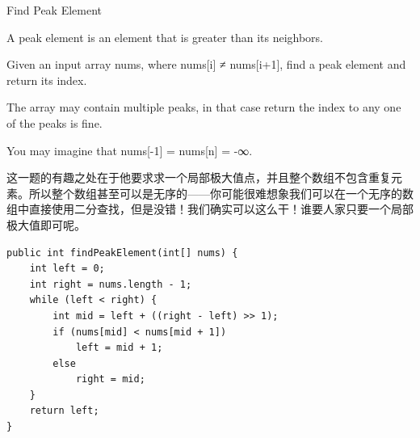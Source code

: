 \documentclass[9pt, b5paaper]{book}
\begin{document}
Find Peak Element

A peak element is an element that is greater than its neighbors.

Given an input array nums, where nums[i] ≠ nums[i+1], find a peak element and return its index.

The array may contain multiple peaks, in that case return the index to any one of the peaks is fine.

You may imagine that nums[-1] = nums[n] = -∞.

这一题的有趣之处在于他要求求一个局部极大值点，并且整个数组不包含重复元素。所以整个数组甚至可以是无序的——你可能很难想象我们可以在一个无序的数组中直接使用二分查找，但是没错！我们确实可以这么干！谁要人家只要一个局部极大值即可呢。
\begin{verbatim}
public int findPeakElement(int[] nums) {
    int left = 0;
    int right = nums.length - 1;
    while (left < right) {
        int mid = left + ((right - left) >> 1);
        if (nums[mid] < nums[mid + 1]) 
            left = mid + 1;
        else 
            right = mid;
    }
    return left;
}
\end{verbatim}
\end{document}
